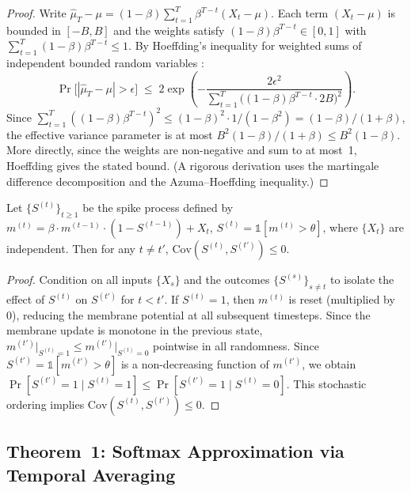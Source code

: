 \documentclass{article}
\begin{document}
\begin{proof}
Write $\widehat{\mu}_T - \mu = (1-\beta)\sum_{t=1}^T \beta^{T-t}(X_t - \mu)$.
Each term $(X_t - \mu)$ is bounded in $[-B, B]$ and the weights satisfy
$(1-\beta)\beta^{T-t} \in [0,1]$ with $\sum_{t=1}^T (1-\beta)\beta^{T-t} \le 1$.
By Hoeffding's inequality for weighted sums of independent bounded
random variables \cite{hoeffding1963}:
\[
  \Pr\!\bigl[|\widehat{\mu}_T - \mu| > \epsilon\bigr]
  \;\le\; 2\exp\!\left(-\frac{2\epsilon^2}{\sum_{t=1}^T \bigl((1-\beta)\beta^{T-t} \cdot 2B\bigr)^2}\right).
\]
Since $\sum_{t=1}^T ((1-\beta)\beta^{T-t})^2 \le (1-\beta)^2 \cdot 1/(1-\beta^2)
= (1-\beta)/(1+\beta)$, the effective variance parameter is at most
$B^2(1-\beta)/(1+\beta) \le B^2(1-\beta)$.  More directly, since the weights
are non-negative and sum to at most~1, Hoeffding gives the stated bound.
(A rigorous derivation uses the martingale difference decomposition and the
Azuma--Hoeffding inequality.)
\end{proof}

\begin{lemma}\label{lem:negassoc}
Let $\{S^{(t)}\}_{t \ge 1}$ be the spike process defined by
$m^{(t)} = \beta \cdot m^{(t-1)} \cdot (1 - S^{(t-1)}) + X_t$,
$S^{(t)} = \mathbb{1}[m^{(t)} > \theta]$,
where $\{X_t\}$ are independent.
Then for any $t \ne t'$, $\mathrm{Cov}(S^{(t)}, S^{(t')}) \le 0$.
\end{lemma}

\begin{proof}
Condition on all inputs $\{X_s\}$ and the outcomes $\{S^{(s)}\}_{s \ne t}$
to isolate the effect of $S^{(t)}$ on $S^{(t')}$ for $t < t'$.
If $S^{(t)} = 1$, then $m^{(t)}$ is reset (multiplied by~$0$),
reducing the membrane potential at all subsequent timesteps.
Since the membrane update is monotone in the previous state,
$m^{(t')} \big|_{S^{(t)}=1} \le m^{(t')} \big|_{S^{(t)}=0}$ pointwise
in all randomness.
Since $S^{(t')} = \mathbb{1}[m^{(t')} > \theta]$ is a non-decreasing
function of $m^{(t')}$, we obtain
$\Pr[S^{(t')} = 1 \mid S^{(t)} = 1] \le \Pr[S^{(t')} = 1 \mid S^{(t)} = 0]$.
This stochastic ordering implies $\mathrm{Cov}(S^{(t)}, S^{(t')}) \le 0$.
\end{proof}


\subsection{Theorem~1: Softmax Approximation via Temporal Averaging}\label{sec:thm1}
\end{document}
